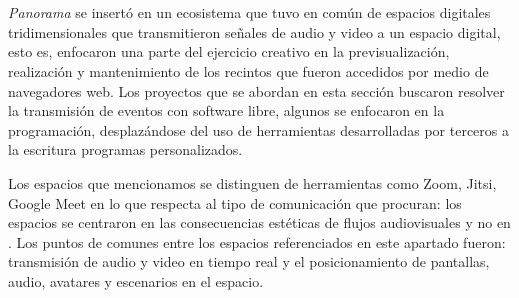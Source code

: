 



\section*{}

\textit{Panorama} se insertó en un ecosistema que tuvo en común  de espacios digitales tridimensionales que transmitieron señales de audio y video a un espacio digital, esto es, enfocaron una parte del ejercicio creativo en la previsualización, realización y mantenimiento de los recintos que fueron accedidos por medio de navegadores web. Los proyectos que se abordan en esta sección buscaron resolver la transmisión de eventos con software libre, algunos se enfocaron en la programación, desplazándose del uso de herramientas desarrolladas por terceros a la escritura programas personalizados.

Los espacios que mencionamos se distinguen de herramientas como Zoom, Jitsi, Google Meet en lo que respecta al tipo de comunicación que procuran: los espacios se centraron en las consecuencias estéticas de flujos audiovisuales y no en . Los puntos de comunes entre los espacios referenciados en este apartado fueron: transmisión de audio y video en tiempo real y el posicionamiento de pantallas, audio, avatares y escenarios en el espacio. 

